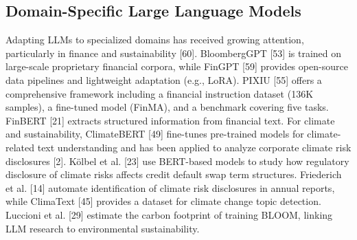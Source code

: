 \documentclass[9pt,twocolumn]{extarticle}
\begin{document}
\subsection{Domain-Specific Large Language Models}
Adapting LLMs to specialized domains has received growing attention,
particularly in finance and sustainability [60].
BloombergGPT [53] is trained on large-scale
proprietary financial corpora, while FinGPT [59]
provides open-source data pipelines and lightweight adaptation (e.g.,
LoRA). PIXIU [55] offers a comprehensive
framework including a financial instruction dataset (136K samples), a
fine-tuned model (FinMA), and a benchmark covering five tasks. FinBERT
[21] extracts structured information from
financial text.
For climate and sustainability, ClimateBERT [49]
fine-tunes pre-trained models for climate-related text understanding and
has been applied to analyze corporate climate risk disclosures
[2]. Kölbel et al. [23] use
BERT-based models to study how regulatory disclosure of climate risks
affects credit default swap term structures. Friederich et al.
[14] automate identification of climate risk
disclosures in annual reports, while ClimaText
[45] provides a dataset for climate change topic
detection. Luccioni et al. [29] estimate the
carbon footprint of training BLOOM, linking LLM research to
environmental sustainability.
\end{document}

